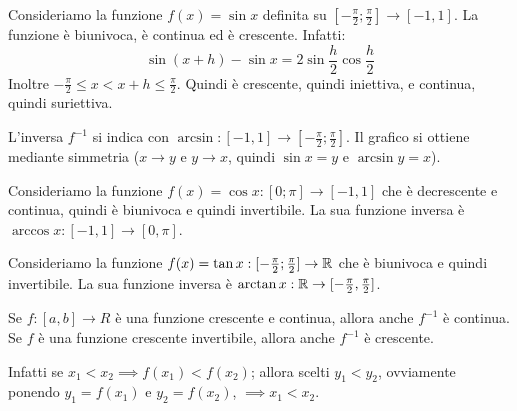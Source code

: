 \begin{example}
Consideriamo la funzione $f(x) = \sin x$ definita su $[-\frac{\pi}{2} ; \frac{\pi}{2}] \to [-1, 1]$. La funzione è biunivoca, è continua ed è crescente. Infatti:
\begin{equation*}
\sin (x+h) - \sin x  = 2 \sin \frac{h}{2} \cos \frac{h}{2}
\end{equation*}
Inoltre $-\frac{\pi}{2} \le x < x + h \le \frac{\pi}{2}$. Quindi è crescente, quindi iniettiva, e continua, quindi suriettiva.

L'inversa $f^{-1}$ si indica con $\arcsin: [-1, 1] \to [-\frac{\pi}{2}; \frac{\pi}{2}]$. Il grafico si ottiene mediante simmetria ($x \to y$ e $y \to x$, quindi $\sin x = y$ e $\arcsin y = x$).
\end{example}

\begin{example}
Consideriamo la funzione $f(x) = \cos x : [0; \pi] \to [-1, 1]$ che è decrescente e continua, quindi è biunivoca e quindi invertibile. La sua funzione inversa è $\arccos x : [-1, 1] \to [0, \pi]$.
\end{example}

\begin{example}
Consideriamo la funzione $f(x) = \tan x : [-\frac{\pi}{2}; \frac{\pi}{2}] \to \mathbb R$ che è biunivoca e quindi invertibile. La sua funzione inversa è $\arctan x : \mathbb R \to [-\frac{\pi}{2}, \frac{\pi}{2}]$.
\end{example}

\begin{theorem}
Se $f: [a, b] \to R$ è una funzione crescente e continua, allora anche $f^{-1}$ è continua. Se $f$ è una funzione crescente invertibile, allora anche $f^{-1}$ è crescente.
\end{theorem}

Infatti se $x_1 < x_2 \implies f(x_1) < f(x_2)$; allora scelti $y_1 < y_2$, ovviamente ponendo $y_1 = f(x_1)$ e $y_2 = f(x_2)$, $\implies x_1 < x_2$.